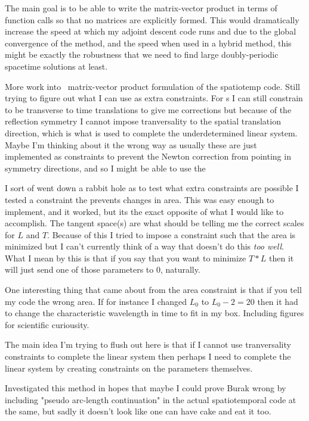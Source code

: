 The main goal is to be able to write the matrix-vector product in terms of
function calls so that no matrices are explicitly formed. This would
dramatically increase the speed at which my adjoint descent code runs and due
to the global convergence of the method, and the speed when used in a hybrid
method, this might be exactly the robustness that we need to find large
doubly-periodic spacetime solutions at least.

More work into \rpo\ matrix-vector product formulation of the spatiotemp code.
Still trying to figure out what I can use as extra constraints.
For \ppo s I can still constrain to be transverse to time translations
to give me corrections but because of the reflection symmetry I cannot
impose tranversality to the spatial translation direction, which is what
is used to complete the underdetermined linear system. Maybe I'm thinking
about it the wrong way as usually these are just implemented as constraints
to prevent the Newton correction from pointing in symmetry directions,
and so I might be able to use the

I sort of went down a rabbit hole as to test what extra constraints are possible
I tested a constraint the prevents changes in area. This was easy enough
to implement, and it worked, but its the exact opposite of what I would
like to accomplish. The tangent space(s) are what should be telling me
the correct scales for $L$ and $T$. Because of this I tried to impose
a constraint such that the area is minimized but I can't currently
think of a way that doesn't do this \emph{too well}. What I mean by
this is that if you say that you want to minimize $T*L$ then it will
just send one of those parameters to $0$, naturally.

One interesting thing that came about from the area constraint is
that if you tell my code the wrong area. If for instance I changed
$L_0$ to $L_0 - 2 = 20$ then it had to change the characteristic
wavelength in time to fit in my box. Including figures for scientific
curiousity.

The main idea I'm trying to flush out here is that if I cannot use
tranversality constraints to complete the linear system then
perhaps I need to complete the linear system by creating constraints
on the parameters themselves.

Investigated this method in hopes that maybe I could prove Burak wrong
by including "pseudo arc-length continuation" in the actual spatiotemporal
code at the same, but sadly it doesn't look like one can have cake and eat
it too.

